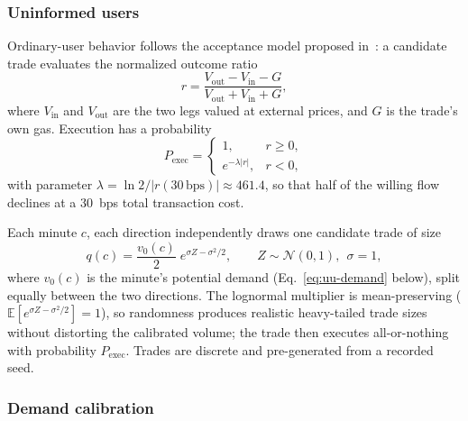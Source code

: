 \documentclass[a4paper,conference]{IEEEtran}
\begin{document}
\subsubsection{Uninformed users}
Ordinary-user behavior follows the acceptance model proposed in~\cite{lebedeva2025dynamic}: a candidate trade evaluates the normalized
outcome ratio
\begin{equation}
  r=\frac{V_{\mathrm{out}}-V_{\mathrm{in}}-G}
  {V_{\mathrm{out}}+V_{\mathrm{in}}+G},
  \label{eq:uu-r}
\end{equation}
where $V_{\mathrm{in}}$ and $V_{\mathrm{out}}$ are the two legs valued
at external prices, and
$G$ is the trade's own gas. Execution has a probability
\begin{equation}
  P_{\mathrm{exec}}=
  \begin{cases}
    1, & r\ge 0,\\
    e^{-\lambda|r|}, & r<0,
  \end{cases}
  \label{eq:uu-p}
\end{equation}
with parameter $\lambda=\ln 2/|r(30\,\mathrm{bps})|
\approx 461.4$, so that half of the willing flow declines at a 30~bps
total transaction cost.

Each minute $c$, each direction independently draws one candidate trade
of size
\begin{equation}
  q(c)=\frac{v_0(c)}{2}\;e^{\sigma Z-\sigma^{2}/2},
  \qquad Z\sim\mathcal{N}(0,1),\ \ \sigma=1,
  \label{eq:uu-size}
\end{equation}
where $v_0(c)$ is the minute's potential demand (Eq.~\eqref{eq:uu-demand} below), split equally between the two directions. The lognormal multiplier is mean-preserving ($\mathbb{E}[e^{\sigma Z-\sigma^{2}/2}]=1$), so randomness produces realistic heavy-tailed trade sizes without distorting the calibrated volume; the trade then executes all-or-nothing with probability $P_{\mathrm{exec}}$. Trades are discrete and pre-generated from a recorded seed.

\subsubsection{Demand calibration}
\end{document}
